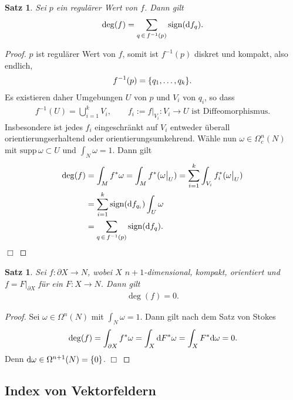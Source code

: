 \documentclass[12pt,a4paper]{article}
\def\sign{\mathrm{sign}}
\def\supp{\mathrm{supp}\,}
\newtheorem{Satz}[Lemma]{Satz}
\def\qed{\quad\hfill\ensuremath{\Box}}
\begin{document}
\bigskip

\begin{Satz}
Sei $p$ ein regul\"arer Wert von $f$. Dann gilt
\begin{align*}
\deg(f) = \sum_{q\,\in\, f^{-1}(p)} \sign(\df_q).
\end{align*}
\end{Satz}

\begin{proof}
$p$ ist regul\"arer Wert von $f$, somit ist $f^{-1}(p)$ diskret und kompakt,
also endlich,
\begin{align*}
f^{-1}(p) = \{q_1,\ldots,q_k\}.
\end{align*}
Es existieren daher Umgebungen $U$ von $p$ und $V_i$ von $q_i$, so dass
\begin{align*}
f^{-1}(U) = \bigcup_{i=1}^k V_i,\qquad
f_i := f\big|_{V_i} : V_i\to U\text{ ist Diffeomorphismus}.
\end{align*}
Insbesondere ist jedes $f_i$ eingeschr\"ankt auf $V_i$ entweder \"uberall
orientierungserhaltend oder orientierungsumkehrend. W\"ahle nun
$\omega\in\Omega_c^n(N)$ mit $\supp\omega\subset U$ und $\int_N \omega = 1$.
Dann gilt
\begin{align*}
\deg(f) &= \int_M f^*\omega =
\int_M f^*(\omega\big|_U)
=
\sum_{i=1}^k 
\int_{V_i} f_i^*(\omega\big|_U)\\
 &=
 \sum_{i=1}^k 
 \sign(\df_{q_i})\int_{U}\omega \\ 
 &=
 \sum_{q\, \in\, f^{-1}(p)} 
 \sign(\df_{q}). 
\end{align*}
\qed
\end{proof}

\bigskip

\begin{Satz}
Sei $f:\partial X \to N$, wobei $X$ $n+1$-dimensional, kompakt, orientiert und
$f = F\big|_{\partial X}$ f\"ur ein $F: X\to N$. Dann gilt
\begin{align*}
\deg(f) = 0.
\end{align*}
\end{Satz}
\begin{proof}
Sei $\omega\in\Omega^n(N)$ mit $\int_{N}\omega = 1$. Dann gilt
nach dem Satz von Stokes
\begin{align*}
\deg(f) = \int_{\partial X} f^*\omega = \int_X\mathrm{d} F^*\omega
= \int_X F^*\mathrm{d}\omega = 0.
\end{align*}
Denn $\mathrm{d}\omega\in\Omega^{n+1}(N) = \{0\}$.
\qed
\end{proof}

\subsection{Index von Vektorfeldern}
\end{document}
